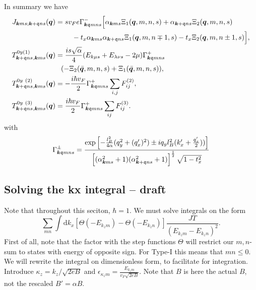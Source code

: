 In summary we have
\begin{align}
  \label{eq:68}
  J_{\vec{k} m s; \vec{k} + \qvec{q} n s} (\vec{q}) &=
  \begin{multlined}[t]
    s v_{F} e
    \Gamma ^-_{\vec{k} \qvec{q} m n s}
    \Big[
    \alpha _{\vec{k} m s} \Xi_{1} (\vec{q}, m, n, s)
      + \alpha _{\vec{k} + \qvec{q} n s} \Xi _{2} (\vec{q}, m, n, s)\\
      - t_x \alpha _{\vec{k} m s} \alpha _{\vec{k} + \qvec{q} n s} \Xi _1(\vec{q}, m, n\mp 1, s)
      - t_x \Xi _2(\vec{q}, m, n\pm 1, s)
    \Big],
  \end{multlined}\\
  T_{\vec{k} + \qvec{q} n s, \vec{k} m s}^{0y (1)} (\vec{q}) &=
  \frac{is \sqrt{\alpha} }{4  }
  (E_{k\mu s} + E_{\lambda  \nu  s} - 2 \mu) \Gamma ^+_{\vec{k} \qvec{q} m n s} \\
  &\pe (-\Xi_{2} (\bar{\vec{q}}, m, n, s) + \Xi_{1}(\bar{\vec{q}}, m, n, s)),\\
  T^{0y~(2)}_{\vec{k} + \qvec{q} ns, \vec{k} ms} (\vec{q})
&= -\frac{ i \hbar v_{F} }{2}
                                                                                     \Gamma _{\vec{k} \qvec{q} m n s}^+
                                                             \sum\limits_{i,j}^{} F^{(2)}_{ij},\\
  T^{0y~(3)}_{\vec{k} + \qvec{q} ns, \vec{k} ms} (\vec{q})
  &= \frac{i \hbar v_F}{2}
    \Gamma ^{+}_{\vec{k} \qvec{q} m n s}
    \sum\limits_{ij}^{} F^{(3)}_{ij}.
\end{align}
with
\[
  \Gamma _{\bm{k} \mathfrak{q} m n s}^{\pm} =
  \frac{
  \exp
  \left[
    - \frac{l_{B}^2}{4 \alpha } (q_{y}^2 + (q' _x)^2) \pm  i q_y l_B^2 (k' _x + \frac{q'_x}{2} )  )
  \right  ]
}{
  \left[(\alpha_{\bm{k} m s}^2 +1) (\alpha_{\bm{k} + \mathfrak{q} ns} ^2 + 1)\right]^{\frac{1}{2}}
  \sqrt{1 - t_x^2 }}
\]

\subsection{Solving the kx integral -- draft}
Note that throughout this seciton, \( \hbar = 1 \).
We must solve integrals on the form
\begin{equation}
  \label{eq:61}
  \sum_{mn} \int \mathrm{d} k_x [ \Theta (-E_{k_z m}) - \Theta (-E_{k_z n} ) ]
  \frac{
    J T
  }{
    ( E_{k_z m } - E_{k_z n} )^2
  }.
\end{equation}
First of all, note that the factor with the step functions \( \Theta  \) will restrict our \( m,n \)-sum to states with energy of opposite sign.
For Type-I this means that \( m n \leq 0 \).
We will rewrite the integral on dimensionless form, to facilitate for integration.
Introduce \( \kappa _z = k_z / \sqrt{2 eB}  \) and \( \epsilon _{\kappa _z m} = \frac{E_{k_z m}}{v_{F } \sqrt{2 eB} } \).
Note that \( B \) is here the actual \( B \), not the rescaled \( B' = \alpha B \).

